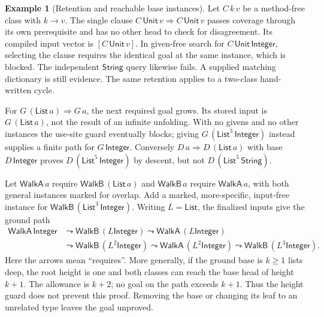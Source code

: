 \documentclass[11pt]{article}
\theoremstyle{definition}
\newtheorem{example}[theorem]{Example}
\newcommand{\Int}{\mathsf{Integer}}
\newcommand{\Str}{\mathsf{String}}
\newcommand{\Unit}{\mathsf{Unit}}
\newcommand{\List}{\mathsf{List}}
\begin{document}
\begin{example}[Retention and reachable base instances]\label{ex:fd-cycle}
Let $C\,k\,v$ be a method-free class with $k\to v$. The single clause
$C\,\Unit\,v\Rightarrow C\,\Unit\,v$ passes coverage through its own
prerequisite and has no other head to check for disagreement. Its compiled
input vector is $[C\,\Unit\,v]$. In given-free search for
$C\,\Unit\,\Int$, selecting the clause requires the identical goal at the
same instance, which is blocked. The independent $\Str$ query likewise fails.
A supplied matching dictionary is still evidence. The same retention
applies to a two-class hand-written cycle.

For $G\,(\List\,a)\Rightarrow G\,a$, the next required goal grows. Its
stored input is $G\,(\List\,a)$, not the result of an infinite unfolding.
With no givens and no other instances the use-site guard eventually blocks;
giving $G\,(\List^3\,\Int)$ instead supplies a finite path for $G\,\Int$.
Conversely $D\,a\Rightarrow D\,(\List\,a)$ with base $D\,\Int$ proves
$D\,(\List^5\,\Int)$ by descent, but not $D\,(\List^5\,\Str)$.

Let $\mathsf{WalkA}\,a$ require $\mathsf{WalkB}\,(\List\,a)$ and
$\mathsf{WalkB}\,a$ require $\mathsf{WalkA}\,a$, with both general instances
marked for overlap. Add a marked, more-specific, input-free instance for
$\mathsf{WalkB}\,(\List^3\,\Int)$.
Writing $L=\List$, the finalized inputs give the ground path
\[
\begin{aligned}
 \mathsf{WalkA}\,\Int &\leadsto \mathsf{WalkB}\,(L\Int)
                        \leadsto \mathsf{WalkA}\,(L\Int)\\
 &\leadsto \mathsf{WalkB}\,(L^2\Int) \leadsto \mathsf{WalkA}\,(L^2\Int)
                        \leadsto \mathsf{WalkB}\,(L^3\Int).
\end{aligned}
\]
Here the arrows mean ``requires''. More generally, if the ground base is
$k\ge1$ lists deep, the root height is one and both classes can reach the
base head of height $k+1$. The allowance is $k+2$; no goal on the path
exceeds $k+1$. Thus the height guard does not prevent this proof. Removing
the base or changing its leaf to an unrelated type leaves the goal unproved.
\end{example}
\end{document}
